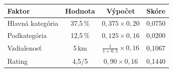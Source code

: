   \begin{table}[H]
  \centering                                                                                                                                                                                                                        
  \begin{tabular}{|l|c|c|c|}
  \hline                                                                                                                                                                                                                            
  \textbf{Faktor} & \textbf{Hodnota} & \textbf{Výpočet} & \textbf{Skóre} \\                                                                                                                                                         
  \hline                                                                                                                                                                                                                            
  Hlavná kategória & 37,5\,\% & $0{,}375 \times 0{,}20$ & 0,0750 \\                                                                                                                                                                 
  \hline                                                                                                                                                                                                                            
  Podkategória & 12,5\,\% & $0{,}125 \times 0{,}16$ & 0,0200 \\                                                                                                                                                                     
  \hline                                                                                                                                                                                                                            
  Vzdialenosť & 5\,km & $\frac{1}{1+0{,}5} \times 0{,}16$ & 0,1067 \\                                                                                                                                                               
  \hline                                                                                                                                                                                                                            
  Rating & 4,5/5 & $0{,}90 \times 0{,}16$ & 0,1440 \\                                                                                                                                                                               

\end{tabular}
\end{table}

